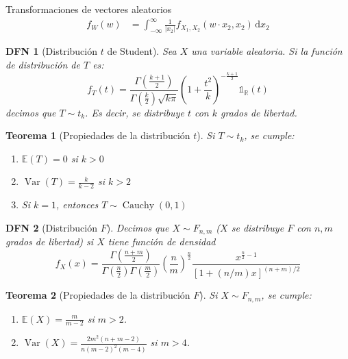 \documentclass[a4paper]{article}
\newtheorem{definition}{DFN}
\theoremstyle{mytheoremstyle}
\newtheorem{theorem}{Teorema}
\newcommand{\R}{\mathbb{R}}
\newcommand{\E}{\mathbb{E}}
\newcommand{\1}{\mathds{1}}
\DeclareMathOperator{\Var}{Var}
\newcommand{\diff}[1]{\,\mathrm{d}#1}
\begin{document}
\begin{multicols*}{3}
\begin{roundbox}{Transformaciones de vectores aleatorios}
\begin{align*}
    f_W(w) &= \int_{-\infty}^{\infty} \frac{1}{|x_2|} f_{X_1, X_2} \left( w \cdot x_2, x_2  \right) \diff{x_2} 
\end{align*}

\begin{definition}[Distribución $t$ de Student]
    Sea $X$ una variable aleatoria.
    Si la función de distribución de $T$ es:
    \begin{equation*}
        f_T(t) = \frac{\Gamma\left( \frac{k+1}{2}\right)}{\Gamma\left( \frac{k}{2} \right)\sqrt{k \pi}  } \left( 1 + \frac{t^{2}}{k} \right)^{-\frac{k+1}{2}} \1_{\R}(t) 
    \end{equation*}
    decimos que $T \sim t_k$. Es decir, se distribuye $t$ con $k$ grados de libertad.
\end{definition}

\begin{theorem}[Propiedades de la distribución $t$]
    Si $T \sim t_k$, se cumple:
    \begin{enumerate}
        \item $\E(T) = 0$ si $k>0$
        \item $\Var(T) = \frac{k}{k-2}$ si $k>2$
        \item Si $k=1$, entonces $T \sim \operatorname{Cauchy}(0,1)$
    \end{enumerate}
\end{theorem}

\begin{definition}[Distribución $F$]
    Decimos que $X \sim F_{n,m}$ ($X$ se distribuye $F$ con $n, m$ grados de libertad) si $X$ tiene función de densidad
    \begin{equation*}
        f_X(x) = \frac{\Gamma \left( \frac{n+m}{2} \right)}{\Gamma \left( \frac{n}{2} \right) \Gamma \left( \frac{m}{2} \right)} \left( \frac{n}{m} \right)^{\frac{n}{2}} \frac{x^{\frac{n}{2} - 1}}{\left[ 1 + (n/m)x \right]^{(n+m)/2}}
    \end{equation*}    
\end{definition}

\begin{theorem}[Propiedades de la distribución $F$]
    Si $X \sim F_{n,m}$, se cumple:
    \begin{enumerate}
        \item $\E(X)= \frac{m}{m-2}$ si $m >2$.
        \item $\Var(X) = \frac{2 m^{2} (n+m-2)}{n(m-2)^{2} (m-4)}$ si $m>4$.
    \end{enumerate}
\end{theorem}


\end{roundbox}
\end{multicols*}
\end{document}
